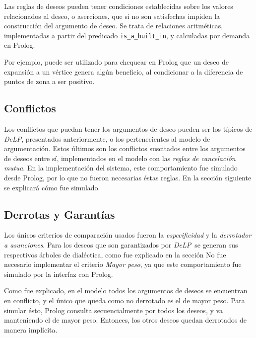 \documentclass[oneside]{book}
\theoremstyle{definition}
\theoremstyle{example}
\newcommand{\DLP}{\mbox{\textit{DeLP}}}
\begin{document}
Las reglas de deseos pueden tener condiciones establecidas sobre los valores relacionados al deseo,
o aserciones, que
si no son satisfechas impiden la construcción del argumento de deseo. Se trata de relaciones aritméticas,
implementadas a partir del predicado \texttt{is\_a\_built\_in}, y calculadas por demanda en Prolog.

Por ejemplo, puede ser utilizado para chequear en Prolog que un deseo de expansión a un vértice genera
algún beneficio, al condicionar a la diferencia de puntos de zona a ser positivo.

\subsection{Conflictos}

Los conflictos que puedan tener los argumentos de deseo pueden ser los típicos de \DLP,
presentados anteriormente, o
los pertenecientes al modelo de argumentación. Estos últimos son los conflictos suscitados entre 
los argumentos de deseos entre sí, implementados en el modelo con las \textit{reglas de cancelación
mutua}. En la implementación del sistema, este comportamiento fue simulado desde Prolog, por lo que 
no fueron necesarias éstas reglas. En la sección siguiente se explicará cómo fue simulado.

\subsection{Derrotas y Garantías}

Los únicos criterios de comparación usados fueron la \textit{especificidad} y la \textit{derrotador a 
asunciones}. Para los deseos que son garantizados por \DLP\ se generan sus respectivos árboles de dialéctica, como 
fue explicado en la sección %
No fue necesario implementar el criterio \textit{Mayor peso}, ya que este comportamiento
fue simulado por la interfaz con Prolog.

Como fue explicado, en el modelo todos los argumentos de deseos se encuentran en conflicto, y el 
único que queda como no derrotado es el de mayor peso. Para simular ésto, Prolog consulta 
secuencialmente por todos los deseos, y va manteniendo el de mayor peso. Entonces, los otros deseos
quedan derrotados de manera implícita.
\end{document}
